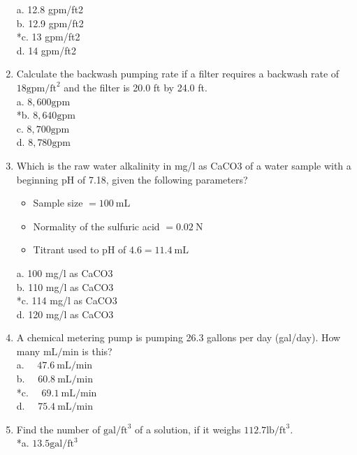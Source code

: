 \begin{enumerate}
\begin{itemize}
\end{itemize}
a. 12.8 gpm/ft2\\
b. 12.9 gpm/ft2\\
*c. 13 gpm/ft2\\
d. 14 gpm/ft2\\
  \item Calculate the backwash pumping rate if a filter requires a backwash rate of $18 \mathrm{gpm} / \mathrm{ft}^{2}$ and the filter is 20.0 ft by 24.0 ft.\\
a. $8,600 \mathrm{gpm}$\\
*b. $8,640 \mathrm{gpm}$\\
c. $8,700 \mathrm{gpm}$\\
d. $8,780 \mathrm{gpm}$ \\
\item Which is the raw water alkalinity in mg/l as CaCO3 of a water sample with a beginning pH of 7.18, given the following parameters?\\
\begin{itemize}
  \item Sample size $=100 \mathrm{~mL}$\\
  \item Normality of the sulfuric acid $=0.02 \mathrm{~N}$\\
  \item Titrant used to pH of $4.6=11.4 \mathrm{~mL}$\\
\end{itemize}
a. 100 mg/l as CaCO3\\
b. 110 mg/l as CaCO3\\
*c. 114 mg/l as CaCO3\\
d. 120 mg/l as CaCO3\\
  \item A chemical metering pump is pumping 26.3 gallons per day (gal/day). How many $\mathrm{mL} / \mathrm{min}$ is this?\\
a. $\quad 47.6 \mathrm{~mL} / \mathrm{min}$\\
b. $\quad 60.8 \mathrm{~mL} / \mathrm{min}$\\
*c. $\quad 69.1 \mathrm{~mL} / \mathrm{min}$\\
d. $\quad 75.4 \mathrm{~mL} / \mathrm{min}$\\
  \item Find the number of $\mathrm{gal} / \mathrm{ft}^{3}$ of a solution, if it weighs $112.7 \mathrm{lb} / \mathrm{ft}^{3}$.\\
*a. $13.5 \mathrm{gal} / \mathrm{ft}^{3}$\\

\end{enumerate}

